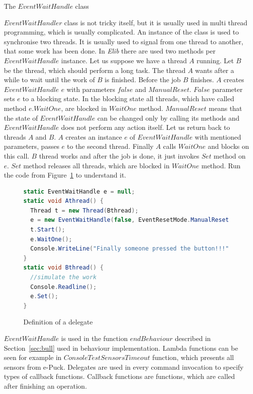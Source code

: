   \begin{definition}[$EventWaitHandle$]
  The $EventWaitHandle$ class 
  \end{definition}
  $EventWaitHandler$ class is not tricky itself, 
  but it is usually used in multi thread programming, which is usually complicated.
  An instance of the class is used to synchronise two threads. 
  It is usually used to signal from one thread to another, 
  that some work has been done. In {\it Elib} there are used two 
  methods per~$EventWaitHandle$ instance.
  Let us suppose we have a thread $A$ running. Let $B$ be the thread, 
  which should perform a long task. 
  The thread $A$ wants after a while to wait until the work of $B$ is finished.
  Before the job $B$ finishes. $A$ creates $EventWaitHandle$ $e$ 
  with parameters $false$ and $ManualReset$. 
  $False$ parameter sets $e$ to a blocking state. In the blocking state all threads, 
  which have called method $e.WaitOne$, 
  are blocked in $WaitOne$ method. $ManualReset$ means that the state of $EventWaitHandle$ 
  can be changed only by calling its methods and $EventWaitHandle$ 
  does not perform any action itself.
  Let us return back to threads $A$ and $B$. $A$ creates an instance $e$ of $EventWaitHandle$ with mentioned parameters, 
  passes $e$ to the second thread. 
  Finally $A$ calls $WaitOne$ and blocks on this call.
  $B$ thread works and after the job is done, it just invokes $Set$ method on $e$. 
  $Set$ method releases all threads, which are blocked in $WaitOne$ method.
  Run the code from Figure~\ref{ewh} to understand it.

          
\begin{figure}[!hbp]
\begin{lstlisting}[language=cs]
static EventWaitHandle e = null;
static void Athread() {
  Thread t = new Thread(Bthread);
  e = new EventWaitHandle(false, EventResetMode.ManualReset);
  t.Start();
  e.WaitOne();
  Console.WriteLine("Finally someone pressed the button!!!");
}
static void Bthread() {
  //simulate the work      
  Console.Readline();
  e.Set();
}
\end{lstlisting}
\caption{Definition of a delegate} \label{ewh}
\end{figure}

   $EventWaitHandle$ is used in the function $endBehaviour$ described in Section~\ref{sec:bull} 
   used in behaviour implementation.
   Lambda functions can be seen for example in $ConsoleTestSensorsTimeout$ function, which presents all sensors from e-Puck.
   Delegates are used in every command invocation to specify types of callback functions.
   Callback functions are functions, which are called after finishing an operation. 
  
